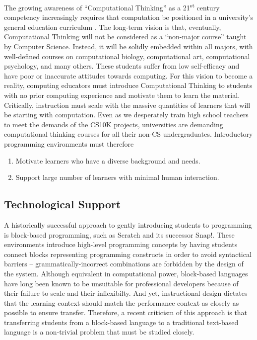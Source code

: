 \documentclass{sig-alternate}
\begin{document}
The growing awareness of ``Computational Thinking'' as a 21\textsuperscript{st} century competency increasingly requires that computation be positioned in a university's general education curriculum \cite{wing2006computational}.
The long-term vision is that, eventually, Computational Thinking will not be considered as a ``non-major course'' taught by Computer Science.
Instead, it will be solidly embedded within all majors, with well-defined courses on computational biology, computational art, computational psychology, and many others.
These students suffer from low self-efficacy and have poor or inaccurate attitudes towards computing.
For this vision to become a reality, computing educators must introduce Computational Thinking to students with no prior computing experience and motivate them to learn the material.
Critically, instruction must scale with the massive quantities of learners that will be starting with computation.
Even as we desperately train high school teachers to meet the demands of the CS10K projects, universities are demanding computational thinking courses for all their non-CS undergraduates.
Introductory programming environments must therefore
\begin{enumerate}
	\item Motivate learners who have a diverse background and needs.
	\item Support large number of learners with minimal human interaction.
\end{enumerate}

\subsection{Technological Support}

A historically successful approach to gently introducing students to programming is block-based programming, such as Scratch and its successor Snap!.
These environments introduce high-level programming concepts by having students connect blocks representing programming constructs in order to avoid syntactical barriers -- grammatically-incorrect combinations are forbidden by the design of the system.
Although equivalent in computational power, block-based languages have long been known to be unsuitable for professional developers because of their failure to scale and their inflexibilty. 
And yet, instructional design dictates that the learning context should match the performance context as closely as possible to ensure transfer.
Therefore, a recent criticism of this approach is that transferring students from a block-based language to a traditional text-based language is a non-trivial problem that must be studied closely.
\end{document}

